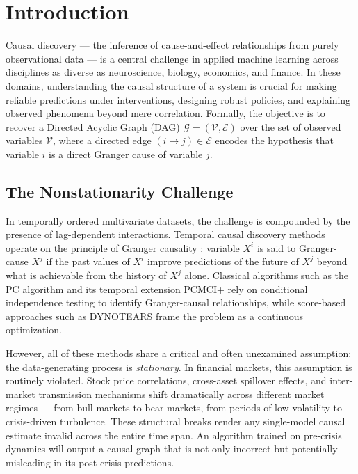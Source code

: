 \section{Introduction}

Causal discovery — the inference of cause-and-effect relationships from purely observational data — is a central challenge in applied machine learning across disciplines as diverse as neuroscience, biology, economics, and finance. In these domains, understanding the causal structure of a system is crucial for making reliable predictions under interventions, designing robust policies, and explaining observed phenomena beyond mere correlation. Formally, the objective is to recover a Directed Acyclic Graph (DAG) $\mathcal{G} = (\mathcal{V}, \mathcal{E})$ over the set of observed variables $\mathcal{V}$, where a directed edge $(i \rightarrow j) \in \mathcal{E}$ encodes the hypothesis that variable $i$ is a direct Granger cause of variable $j$.

\subsection{The Nonstationarity Challenge}

In temporally ordered multivariate datasets, the challenge is compounded by the presence of lag-dependent interactions. Temporal causal discovery methods operate on the principle of Granger causality \cite{granger1969investigating}: variable $X^i$ is said to Granger-cause $X^j$ if the past values of $X^i$ improve predictions of the future of $X^j$ beyond what is achievable from the history of $X^j$ alone. Classical algorithms such as the PC algorithm and its temporal extension PCMCI+ \cite{runge2019detecting} rely on conditional independence testing to identify Granger-causal relationships, while score-based approaches such as DYNOTEARS \cite{pamfil2020dynotears} frame the problem as a continuous optimization.

However, all of these methods share a critical and often unexamined assumption: the data-generating process is \textit{stationary}. In financial markets, this assumption is routinely violated. Stock price correlations, cross-asset spillover effects, and inter-market transmission mechanisms shift dramatically across different market regimes — from bull markets to bear markets, from periods of low volatility to crisis-driven turbulence. These structural breaks render any single-model causal estimate invalid across the entire time span. An algorithm trained on pre-crisis dynamics will output a causal graph that is not only incorrect but potentially misleading in its post-crisis predictions.

